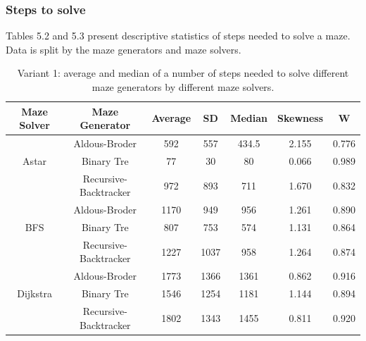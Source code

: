 \subsubsection{Steps to solve}
Tables 5.2 and 5.3 present descriptive statistics of steps needed to solve a maze. Data is split by the maze generators and maze solvers. 
\begin{table}[!ht]
    \centering
    \caption{Variant 1: average and median of a number of steps needed to solve different maze generators by different maze solvers.} 
    \begin{tabular}{c c c c c c c}
    \hline
        Maze Solver & Maze Generator & Average & SD & Median & Skewness & W\\ \hline
        ~ & Aldous-Broder & 592 & 557 & 434.5 & 2.155 & 0.776\\ 
        Astar & Binary Tre & 77 & 30 & 80 & 0.066 & 0.989 \\ 
        ~ & Recursive-Backtracker & 972 & 893 & 711 & 1.670 & 0.832\\ \hline
        ~ & Aldous-Broder & 1170 & 949 & 956 & 1.261 & 0.890\\ 
        BFS & Binary Tre & 807 & 753 & 574 & 1.131 & 0.864\\ 
        ~ & Recursive-Backtracker & 1227 & 1037 & 958 & 1.264 & 0.874\\ \hline
        ~ & Aldous-Broder & 1773 & 1366 & 1361 & 0.862 & 0.916\\ 
        Dijkstra & Binary Tre & 1546 & 1254 & 1181 & 1.144 & 0.894\\ 
        ~ & Recursive-Backtracker & 1802 & 1343 & 1455 & 0.811 & 0.920\\ \hline
    \end{tabular}
\end{table}

